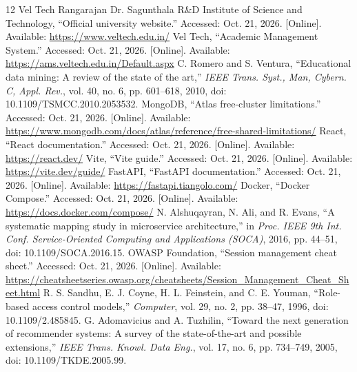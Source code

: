 \clearpage{}
{}
\renewcommand{\bibname}{References}
\begingroup\normalsize\linespread{1.1}\selectfont
\begin{thebibliography}{12}
Vel Tech Rangarajan Dr. Sagunthala R\&D Institute of Science and Technology,
``Official university website.'' Accessed: Oct. 21, 2026. [Online]. Available:
\url{https://www.veltech.edu.in/}
Vel Tech, ``Academic Management System.'' Accessed: Oct. 21, 2026.
[Online]. Available: \url{https://ams.veltech.edu.in/Default.aspx}
C. Romero and S. Ventura,
``Educational data mining: A review of the state of the art,''
\textit{IEEE Trans. Syst., Man, Cybern. C, Appl. Rev.},
vol. 40, no. 6, pp. 601--618, 2010, doi: 10.1109/TSMCC.2010.2053532.
MongoDB, ``Atlas free-cluster limitations.'' Accessed: Oct. 21, 2026.
[Online]. Available: \url{https://www.mongodb.com/docs/atlas/reference/free-shared-limitations/}
React, ``React documentation.'' Accessed: Oct. 21, 2026.
[Online]. Available: \url{https://react.dev/}
Vite, ``Vite guide.'' Accessed: Oct. 21, 2026.
[Online]. Available: \url{https://vite.dev/guide/}
FastAPI, ``FastAPI documentation.'' Accessed: Oct. 21, 2026.
[Online]. Available: \url{https://fastapi.tiangolo.com/}
Docker, ``Docker Compose.'' Accessed: Oct. 21, 2026.
[Online]. Available: \url{https://docs.docker.com/compose/}
N. Alshuqayran, N. Ali, and R. Evans,
``A systematic mapping study in microservice architecture,''
in \textit{Proc. IEEE 9th Int. Conf. Service-Oriented Computing and Applications (SOCA)},
2016, pp. 44--51, doi: 10.1109/SOCA.2016.15.
OWASP Foundation, ``Session management cheat sheet.'' Accessed: Oct. 21, 2026.
[Online]. Available:
\url{https://cheatsheetseries.owasp.org/cheatsheets/Session_Management_Cheat_Sheet.html}
R. S. Sandhu, E. J. Coyne, H. L. Feinstein, and C. E. Youman,
``Role-based access control models,'' \textit{Computer},
vol. 29, no. 2, pp. 38--47, 1996, doi: 10.1109/2.485845.
G. Adomavicius and A. Tuzhilin,
``Toward the next generation of recommender systems: A survey of the state-of-the-art and possible extensions,''
\textit{IEEE Trans. Knowl. Data Eng.}, vol. 17, no. 6, pp. 734--749, 2005,
doi: 10.1109/TKDE.2005.99.
\end{thebibliography}
\endgroup

